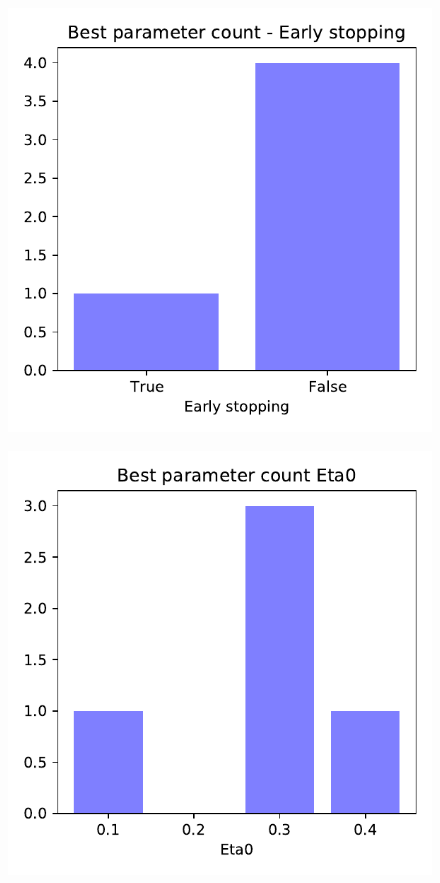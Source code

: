 \documentclass[11pt]{article}
\begin{document}
\begin{figure}[h]
\begin{minipage}[l]{0.3\textwidth}
\includegraphics[width=1\linewidth]{bridges/Best_parameter_count_Early_stop.pdf}
\end{minipage}
\begin{minipage}[l]{0.3\textwidth}
\includegraphics[width=1\linewidth]{bridges/Best_parameter_count_Eta0.pdf} \\

\end{minipage}
\end{figure}
\end{document}
